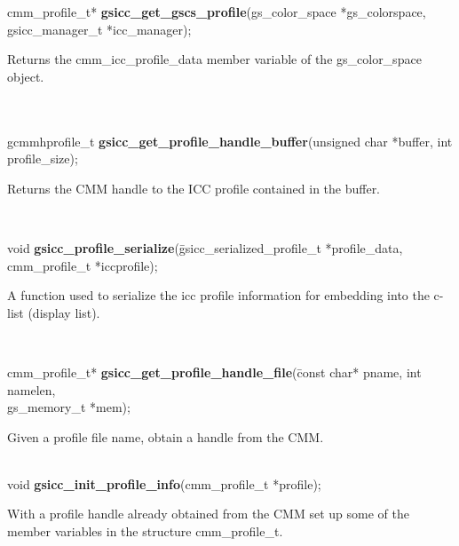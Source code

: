 \documentclass[12pt,notitlepage]{article}
\begin{document}
\noindent cmm\_profile\_t* {\bf gsicc\_get\_gscs\_profile}(gs\_color\_space *gs\_colorspace, gsicc\_manager\_t *icc\_manager);\\

\begin{minipage}[h]{6.0in}
Returns the cmm\_icc\_profile\_data member variable of the gs\_color\_space object.
\end{minipage}\\
\\

\noindent gcmmhprofile\_t {\bf gsicc\_get\_profile\_handle\_buffer}(unsigned char *buffer, int profile\_size);\\

\begin{minipage}[h]{6.0in}
Returns the CMM handle to the ICC profile contained in the buffer.
\end{minipage}\\

\begin{tabbing}
\noindent void  {\bf gsicc\_profile\_serialize}(\=gsicc\_serialized\_profile\_t *profile\_data,\\
\>cmm\_profile\_t *iccprofile);\\
\end{tabbing}

\begin{minipage}[h]{6.0in}
A function used to serialize the icc profile information for embedding into the c-list (display list).
\end{minipage}\\

\begin{tabbing}
\noindent cmm\_profile\_t* {\bf gsicc\_get\_profile\_handle\_file}(\=const char* pname, int namelen, \\
\>gs\_memory\_t *mem);\\
\end{tabbing}

\begin{minipage}[h]{6.0in}
Given a profile file name, obtain a handle from the CMM.
\end{minipage}\\

\noindent void {\bf gsicc\_init\_profile\_info}(cmm\_profile\_t *profile);\\

\begin{minipage}[h]{6.0in}
With a profile handle already obtained from the CMM set up some of the member variables in the structure cmm\_profile\_t.
\end{minipage}\\
\end{document}
